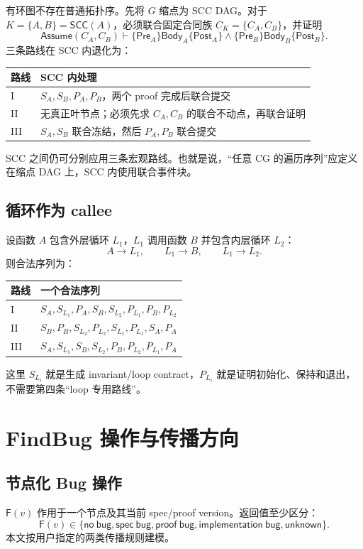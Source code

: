 \documentclass[UTF8,a4paper,11pt]{ctexart}
\newcommand{\FindBug}{\mathsf{F}}
\newcommand{\Pre}{\mathsf{Pre}}
\newcommand{\Post}{\mathsf{Post}}
\newcommand{\Body}{\mathsf{Body}}
\newcommand{\SCC}{\mathsf{SCC}}
\newcommand{\Assume}{\mathsf{Assume}}
\begin{document}
有环图不存在普通拓扑序。先将 $G$ 缩点为 SCC DAG。对于 $K=\{A,B\}=\SCC(A)$，必须联合固定合同族 $C_K=\{C_A,C_B\}$，并证明
\[
  \Assume(C_A,C_B)\vdash
  \{\Pre_A\}\Body_A\{\Post_A\}
  \land
  \{\Pre_B\}\Body_B\{\Post_B\}.
\]
三条路线在 SCC 内退化为：
\begin{center}
\begin{tabular}{ll}
\toprule
路线 & SCC 内处理\\
\midrule
I & $S_A,S_B,P_A,P_B$，两个 proof 完成后联合提交\\
II & 无真正叶节点；必须先求 $C_A,C_B$ 的联合不动点，再联合证明\\
III & $S_A,S_B$ 联合冻结，然后 $P_A,P_B$ 联合提交\\
\bottomrule
\end{tabular}
\end{center}
SCC 之间仍可分别应用三条宏观路线。也就是说，“任意 CG 的遍历序列”应定义在缩点 DAG 上，SCC 内使用联合事件块。

\subsection{循环作为 callee}

设函数 $A$ 包含外层循环 $L_1$，$L_1$ 调用函数 $B$ 并包含内层循环 $L_2$：
\[
  A\to L_1,\qquad L_1\to B,\qquad L_1\to L_2.
\]
则合法序列为：
\begin{center}
\begin{tabular}{ll}
\toprule
路线 & 一个合法序列\\
\midrule
I & $S_A,S_{L_1},P_A,S_B,S_{L_2},P_{L_1},P_B,P_{L_2}$\\
II & $S_B,P_B,S_{L_2},P_{L_2},S_{L_1},P_{L_1},S_A,P_A$\\
III & $S_A,S_{L_1},S_B,S_{L_2},P_B,P_{L_2},P_{L_1},P_A$\\
\bottomrule
\end{tabular}
\end{center}
这里 $S_{L_i}$ 就是生成 invariant/loop contract，$P_{L_i}$ 就是证明初始化、保持和退出，不需要第四条“loop 专用路线”。

\section{FindBug 操作与传播方向}

\subsection{节点化 Bug 操作}

$\FindBug(v)$ 作用于一个节点及其当前 spec/proof version。返回值至少区分：
\[
  \FindBug(v)\in
  \{\mathsf{no\ bug},\mathsf{spec\ bug},\mathsf{proof\ bug},
    \mathsf{implementation\ bug},\mathsf{unknown}\}.
\]
本文按用户指定的两类传播规则建模。
\end{document}
